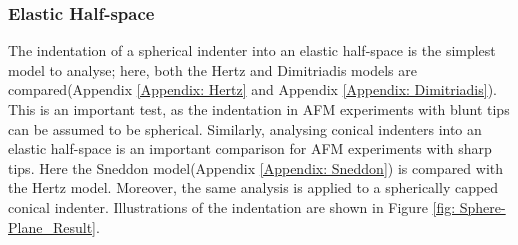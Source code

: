 \subsubsection{Elastic Half-space}

The indentation of a spherical indenter into an elastic half-space is the simplest model to analyse; here, both the Hertz\cite{kontomaris2018hertz} and Dimitriadis models\cite{DIMITRIADIS20022798} are compared(Appendix \ref{Appendix: Hertz} and Appendix \ref{Appendix: Dimitriadis}). This is an important test, as the indentation in AFM experiments with blunt tips can be assumed to be spherical\cite{kontomaris2019determination,chen_luo_doudevski_erten_kim_2019}. Similarly, analysing conical indenters into an elastic half-space is an important comparison for AFM experiments with sharp tips. Here the Sneddon model\cite{han2021modified}(Appendix \ref{Appendix: Sneddon}) is compared with the Hertz model. Moreover, the same analysis is applied to a spherically capped conical indenter. Illustrations of the indentation are shown in Figure \ref{fig: Sphere-Plane_Result}.

